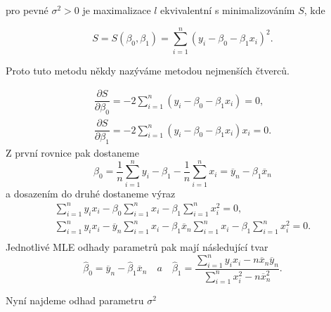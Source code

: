 pro pevné $ \sigma^{2} > 0 $ je maximalizace $ l $ ekvivalentní s minimalizováním $ S $, kde

\begin{equation}
S = S ( \beta_{0} , \beta_{1} ) = \sum_{i = 1}^{n}( y_{i} -  \beta_{0}  - \beta_{1} x_{i})^{2}.
\end{equation}

Proto tuto metodu někdy nazýváme metodou nejmenších čtverců.

\begin{equation}
\begin{aligned}
\dfrac{\partial S}{\partial \beta_{0}} = - 2 \sum_{i = 1}^{n}( y_{i} -  \beta_{0}  - \beta_{1} x_{i}) = 0 , \\
\dfrac{\partial S}{\partial \beta_{1}} = - 2 \sum_{i = 1}^{n}( y_{i} -  \beta_{0}  - \beta_{1} x_{i}) x_{i}= 0 .
\end{aligned}
\end{equation}
Z první rovnice pak dostaneme
\begin{equation}
 \beta_{0} = \dfrac{1}{n} \sum_{i = 1}^{n} y_{i} -  \beta_{1}  - \dfrac{1}{n} \sum_{i = 1}^{n} x_{i} = \overline{y}_{n} - \beta_{1} \overline{x}_{n}
\end{equation}
a dosazením do druhé dostaneme výraz
\begin{equation}
\begin{aligned}
\sum_{i=1}^{n} y_{i} x_{i} - \beta_{0} \sum_{i=1}^{n} x_{i} - \beta_{1} \sum_{i=1}^{n} x_{i}^{2} = 0 , \\
\sum_{i=1}^{n} y_{i} x_{i} - \overline{y}_{n} \sum_{i=1}^{n} x_{i} - \beta_{1} \overline{x}_{n} \sum_{i=1}^{n} x_{i} - \beta_{1} \sum_{i=1}^{n} x_{i}^{2} = 0. \\
\end{aligned}
\end{equation}
Jednotlivé MLE odhady parametrů pak mají následující tvar
\begin{equation}
\widehat{\beta}_{0} = \overline{y}_{n} - \widehat{\beta}_{1} \overline{x}_{n} \quad a \quad
\widehat{\beta}_{1} = \dfrac{\sum_{i=1}^{n} y_{i} x_{i} - n \overline{x}_{n} \overline{y}_{n}}{\sum_{i=1}^{n} x_{i}^{2} - n \overline{x}_{n}^{2}}.
\end{equation}

Nyní najdeme odhad parametru $ \sigma^{2} $ 

